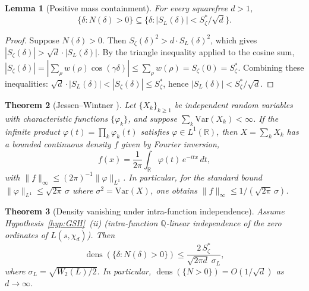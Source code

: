 \documentclass[12pt,reqno]{amsart}
\theoremstyle{plain}
\newtheorem{theorem}{Theorem}[section]
\newtheorem{lemma}[theorem]{Lemma}
\theoremstyle{definition}
\theoremstyle{remark}
\DeclareMathOperator{\dens}{dens}
\newcommand{\Q}{\mathbb{Q}}
\newcommand{\R}{\mathbb{R}}
\begin{document}
\begin{lemma}[Positive mass containment]\label{lem:containment}
For every squarefree $d > 1$,
\[
\{\delta : N(\delta) > 0\} \subseteq \{\delta : |S_{L}(\delta)| < S_\zeta^*/\sqrt{d}\}.
\]
\end{lemma}

\begin{proof}
Suppose $N(\delta) > 0$. Then $S_\zeta(\delta)^2 > d \cdot S_L(\delta)^2$, which gives $|S_\zeta(\delta)| > \sqrt{d} \cdot |S_L(\delta)|$. By the triangle inequality applied to the cosine sum, $|S_\zeta(\delta)| = |\sum_\rho w(\rho)\cos(\gamma\delta)| \leq \sum_\rho w(\rho) = S_\zeta(0) = S_\zeta^*$. Combining these inequalities: $\sqrt{d} \cdot |S_L(\delta)| < |S_\zeta(\delta)| \leq S_\zeta^*$, hence $|S_L(\delta)| < S_\zeta^*/\sqrt{d}$.
\end{proof}

\begin{theorem}[Jessen--Wintner {\cite{JessenWintner}}]\label{thm:jessen-wintner}
Let $\{X_k\}_{k \geq 1}$ be independent random variables with characteristic
functions $\{\varphi_k\}$, and suppose $\sum_k \mathrm{Var}(X_k) < \infty$.
If the infinite product $\varphi(t) = \prod_k \varphi_k(t)$ satisfies
$\varphi \in L^1(\R)$, then $X = \sum_k X_k$ has a bounded continuous density
$f$ given by Fourier inversion,
\[
f(x) = \frac{1}{2\pi}\int_{\R} \varphi(t)\,e^{-itx}\,dt,
\]
with $\|f\|_\infty \leq (2\pi)^{-1}\|\varphi\|_{L^1}$.
In particular, for the standard bound $\|\varphi\|_{L^1} \leq \sqrt{2\pi}\,\sigma$
where $\sigma^2 = \mathrm{Var}(X)$, one obtains
$\|f\|_\infty \leq 1/(\sqrt{2\pi}\,\sigma)$.
\end{theorem}

\begin{theorem}[Density vanishing under intra-function independence]\label{thm:density-vanishing}
Assume Hypothesis~\ref{hyp:GSH}~\textup{(ii)} (intra-function $\Q$-linear independence of the zero ordinates of $L(s,\chi_d)$). Then
\[
\dens(\{\delta : N(\delta) > 0\}) \leq \frac{2\,S_\zeta^*}{\sqrt{2\pi d}\;\sigma_{L}},
\]
where $\sigma_{L} = \sqrt{W_2(L)/2}$. In particular, $\dens(\{N > 0\}) = O(1/\sqrt{d})$ as $d \to \infty$.
\end{theorem}
\end{document}
